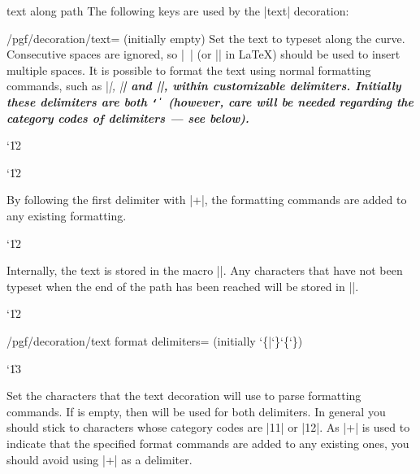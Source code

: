 \begin{decoration}{text along path}
  The following keys are used by the |text| decoration:
  \begin{key}{/pgf/decoration/text=
      (initially \normalfont empty)}
    Set the text to typeset along the curve.
    Consecutive spaces are ignored, so |\ | (or |\space| in \LaTeX)
    should be used to insert multiple spaces.	It is possible to
    format the text using normal formatting commands, such as |\it|, |\bf|
    and |\color|, within customizable delimiters. Initially these
    delimiters are both {\tt\char`\|} (however, care will be needed
    regarding	the category codes of delimiters --- see below).

{\catcode`\|12
\begin{codeexample}[]
\catcode`\|12
\end{codeexample}
}
    By following the first delimiter
    with |+|, the formatting commands are added to any existing
    formatting.

{\catcode`\|12
\begin{codeexample}[]
\end{codeexample}
}

    Internally, the text is stored in the macro |\pgfdecorationtext|.
    Any characters that have not been typeset when the end of the
    path has been reached will be stored in |\pgfdecorationrestoftext|.

  \end{key}

{\catcode`\|12
  \begin{key}{/pgf/decoration/text format delimiters= (initially \char`\{|\char`\}\char`\{\char`\})}

    \catcode`\|13

    Set the characters that the text decoration will use to parse
    formatting commands.
    If  is empty, then  will be used for both
    delimiters.
    In general you should stick to characters	whose category codes are
    |11| or |12|.
    As |+| is used to indicate that the specified format commands
    are added	to any existing ones, you should avoid using |+| as
    a delimiter.


\end{key}}
\end{decoration}
